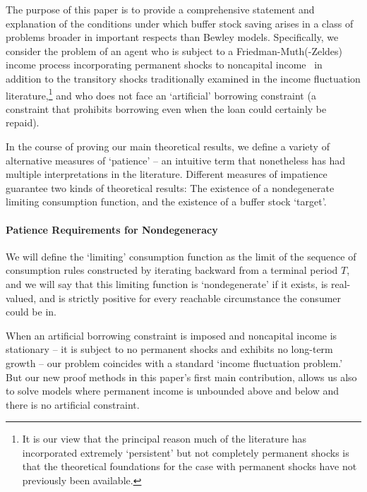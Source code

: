 \documentclass[BufferStockTheory]{subfiles}
\begin{document}
The purpose of this paper is to provide a comprehensive statement and explanation of the conditions under which buffer stock saving arises in a class of problems broader in important respects than Bewley models. Specifically, we consider the problem of an agent who is subject to a Friedman-Muth(-Zeldes) income process incorporating permanent shocks to noncapital income~\citep{friedmanATheory, muthOptimal, zeldesStochastic} in addition to the transitory shocks traditionally examined in the income fluctuation literature,\footnote{It is our view that the principal reason much of the literature has incorporated extremely `persistent' but not completely permanent shocks is that the theoretical foundations for the case with permanent shocks have not previously been available.}
and who does not face an `artificial' borrowing constraint (a constraint that prohibits borrowing even when the loan could certainly be repaid).

In the course of proving our main theoretical results, we define a variety of alternative measures of `patience' -- an intuitive term that nonetheless has had multiple interpretations in the literature. Different measures of impatience guarantee two kinds of theoretical results: The existence of a nondegenerate limiting consumption function, and the existence of a buffer stock `target'.

\paragraph{Patience Requirements for Nondegeneracy}

We will define the `limiting' consumption function as the limit of the sequence of consumption rules constructed by iterating backward from a terminal period $T$, and we will say that this limiting function is `nondegenerate' if it exists, is real-valued, and is strictly positive for every reachable circumstance the consumer could be in.










\newcommand{\APFacRaw}{(\Rfree\DiscFac)^{1/\CRRA}}

When an artificial borrowing constraint is imposed and noncapital income is stationary -- it is subject to no permanent shocks and exhibits no long-term growth %
-- our problem coincides with a standard `income fluctuation problem.' But our new proof methods in this paper's first main contribution, allows us also to solve models where permanent income is unbounded above and below and there is no artificial constraint.
\end{document}
